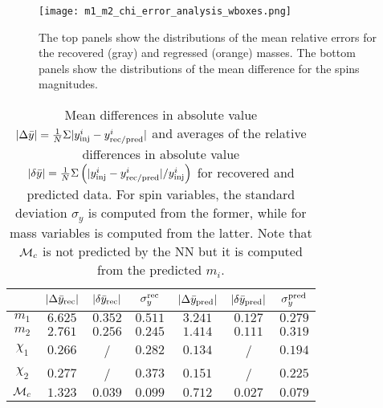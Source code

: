 \begin{figure}
    \centering
    \texttt{[image: m1\_m2\_chi\_error\_analysis\_wboxes.png]}
    \caption{The top panels show the distributions of the mean relative errors 
            for the recovered (gray) and regressed (orange) masses. The bottom
            panels show the distributions of the mean difference for the spins
            magnitudes.
            }
        \label{m_chi_comparisons}
\end{figure}


\begin{table}
  \caption{\label{GPR_errors}  Mean differences in absolute value 
    $|\Delta \bar{y}|=  \frac{1}{N} \Sigma |y^i_{\rm inj} - y^i_{\rm rec/pred}|$
    and averages of the relative differences in absolute value 
    $|\delta \bar{y}| = \frac{1}{N} \Sigma \left( |y^i_{\rm inj} - 
    y^i_{\rm rec/pred}|/y^i_{\rm inj} \right) $ for recovered and predicted data.
    For spin variables, the standard deviation $\sigma_y$ is computed from the 
    former, while for mass variables is computed from the latter. Note that 
    ${\cal{M}}_c$ is not predicted by the NN but it is computed from the 
    predicted $m_i$.}
  \begin{center}
  \begin{tabular}{c|ccc|ccc}
  \hline\hline
  & $|\Delta \bar{y}_{\rm rec}|$  & $|\delta \bar{y}_{\rm rec}|$  & $\sigma_y^{\rm rec}$ &
     $|\Delta \bar{y}_{\rm pred}|$ & $|\delta \bar{y}_{\rm pred}|$ & $\sigma_y^{\rm pred}$ \\
  \hline\hline
$m_1$          & $6.625$ & $0.352$ & $0.511$ & $3.241$ & $0.127$ & $0.279$ \\
$m_2$          & $2.761$ & $0.256$ & $0.245$ & $1.414$ & $0.111$ & $0.319$ \\
$\chi_1$       & $0.266$ &  /  & $0.282$ & $0.134$ &  /  & $0.194$ \\
$\chi_2$       & $0.277$ &  /  & $0.373$ & $0.151$ &  /  & $0.225$ \\
\hline
${\cal{M}}_c$  & $1.323$ & $0.039$ & $0.099$ & $0.712$ & $0.027$ & $0.079$ \\
  \hline\hline
  \end{tabular}
  \end{center}
\end{table}

